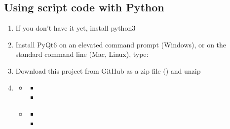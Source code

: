 \documentclass[letterpaper,10pt,english]{sphinxmanual}
\begin{document}
\subsection{Using script code with Python}
\label{\detokenize{introduction:using-script-code-with-python}}\begin{enumerate}
%
\item {} 
\sphinxAtStartPar
If you don’t have it yet, install python3

\item {} 
\sphinxAtStartPar
Install PyQt6 \textendash{} on an elevated command prompt (Windows), or on the standard command line (Mac, Linux), type: 

\item {} 
\sphinxAtStartPar
Download this project from GitHub as a zip file () and unzip

\item {} \begin{description}
\begin{itemize}
\item {} \begin{description}
\begin{itemize}
\item {} 
\sphinxAtStartPar
{}

\item {} 
\sphinxAtStartPar
{}

\end{itemize}

\end{description}

\item {} \begin{description}
\begin{itemize}
\item {} 
\sphinxAtStartPar
{}

\item {} 
\sphinxAtStartPar
{}

\end{itemize}

\end{description}

\end{itemize}

\end{description}

\end{enumerate}
\end{document}
